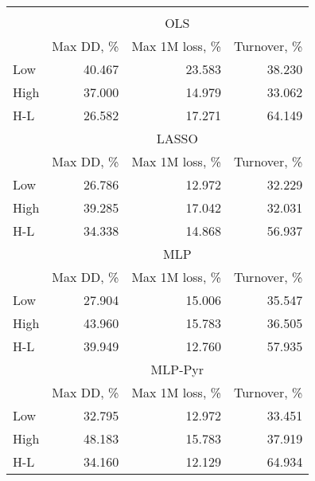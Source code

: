 \begin{tabular}{lrrr}
\hline \hline \\ [-1.8ex]
 & \multicolumn{3}{c}{OLS} \\
 \cmidrule(lr){2-4}
  & Max DD, \% & Max 1M loss, \% & Turnover, \% \\
\midrule
Low & 40.467 & 23.583 & 38.230 \\
High & 37.000 & 14.979 & 33.062 \\
H-L & 26.582 & 17.271 & 64.149 \\
\midrule
 & \multicolumn{3}{c}{LASSO} \\
 \cmidrule(lr){2-4}
  & Max DD, \% & Max 1M loss, \% & Turnover, \% \\
\midrule
Low & 26.786 & 12.972 & 32.229 \\
High & 39.285 & 17.042 & 32.031 \\
H-L & 34.338 & 14.868 & 56.937 \\
\midrule
 & \multicolumn{3}{c}{MLP} \\
 \cmidrule(lr){2-4}
  & Max DD, \% & Max 1M loss, \% & Turnover, \% \\
\midrule
Low & 27.904 & 15.006 & 35.547 \\
High & 43.960 & 15.783 & 36.505 \\
H-L & 39.949 & 12.760 & 57.935 \\
\midrule
 & \multicolumn{3}{c}{MLP-Pyr} \\
 \cmidrule(lr){2-4}
  & Max DD, \% & Max 1M loss, \% & Turnover, \% \\
\midrule
Low & 32.795 & 12.972 & 33.451 \\
High & 48.183 & 15.783 & 37.919 \\
H-L & 34.160 & 12.129 & 64.934 \\
\hline \hline
\end{tabular}